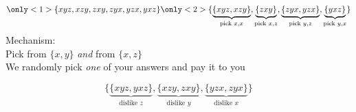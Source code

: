 \begin{frame}{}{}
\begin{center}

  $$
  \only<1>{\{xyz,xzy,zxy,zyx,yzx,yxz\}}
  \only<2>{\{\underbrace{ \{xyz,xzy\} }_{\text{pick }x,x },\underbrace{ \{zxy\} }_{\text{pick }x,z },\underbrace{ \{zyx,yzx\} }_{\text{pick }y,z},\underbrace{ \{yxz\} }_{\text{pick }y,x}\}}
  $$
  \br
  Mechanism:\\
  Pick from $\{x,y\}$ \textit{and} from $\{x,z\}$\\
  We randomly pick \emph{one} of your answers and pay it to you
  \br
\end{center}
\end{frame}

\begin{frame}{}{}
\begin{center}
  $$
  \{\underbrace{ \{xyz,yxz\} }_{ \text{dislike }z },\underbrace{ \{xzy,zxy\} }_{ \text{dislike }y },\underbrace{ \{yzx,zyx\} }_{ \text{dislike }x }\}
  $$
  \br
  \br
  \br
\end{center}
\end{frame}

